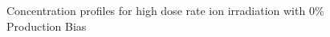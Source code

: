 \documentclass[a4paper]{article}
\begin{document}
      \begin{figure}[h!]  %
        \centering
        \qquad
        \caption{Concentration profiles for high dose rate ion irradiation with 0\% Production Bias}
        \label{figure:concentrations_ion_0_1e-3}
      \end{figure}
\end{document}

